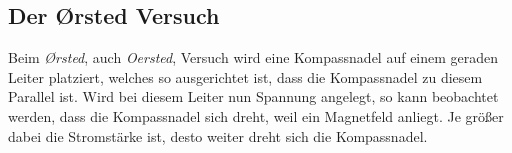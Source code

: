 \documentclass{article}
\begin{document}
\subsection{Der Ørsted Versuch}
Beim \emph{Ørsted}, auch \emph{Oersted}, Versuch wird eine Kompassnadel auf einem geraden Leiter platziert, welches so ausgerichtet ist, dass die Kompassnadel zu diesem Parallel ist. Wird bei diesem Leiter nun Spannung angelegt, so kann beobachtet werden, dass die Kompassnadel sich dreht, weil ein Magnetfeld anliegt. Je größer dabei die Stromstärke ist, desto weiter dreht sich die Kompassnadel. 
 
\end{document}
